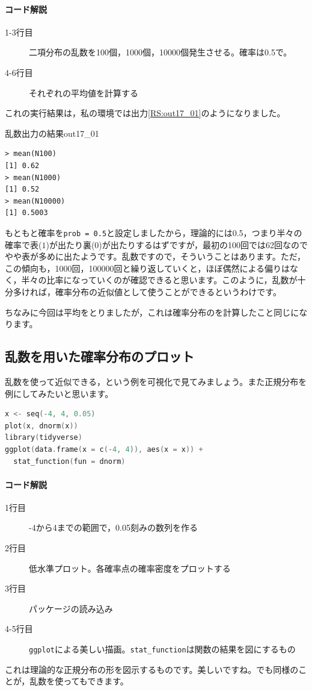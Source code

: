 \documentclass{ltjsbook}
\begin{document}
\paragraph{コード解説}
\begin{description}
	\item[1-3行目] 二項分布の乱数を100個，1000個，10000個発生させる。確率は0.5で。
	\item[4-6行目] それぞれの平均値を計算する
\end{description}
これの実行結果は，私の環境では出力\ref{RS:out17_01}のようになりました。
\begin{Rscreen}{乱数出力の結果}{out17_01}
	\begin{verbatim}
> mean(N100)
[1] 0.62
> mean(N1000)
[1] 0.52
> mean(N10000)
[1] 0.5003\end{verbatim}
\end{Rscreen}

もともと確率を\texttt{prob = 0.5}と設定しましたから，理論的には0.5，つまり半々の確率で表($1$)が出たり裏($0$)が出たりするはずですが，最初の100回では62回なのでやや表が多めに出たようです。乱数ですので，そういうことはあります。ただ，この傾向も，1000回，100000回と繰り返していくと，ほぼ偶然による偏りはなく，半々の比率になっていくのが確認できると思います。このように，乱数が十分多ければ，確率分布の近似値として使うことができるというわけです。

ちなみに今回は平均をとりましたが，これは確率分布のを計算したこと同じになります。
\subsection{乱数を用いた確率分布のプロット}
乱数を使って近似できる，という例を可視化で見てみましょう。また正規分布を例にしてみたいと思います。
\begin{lstlisting}[language=c++,label={code:17_04},caption={確率分布の可視化1}]
x <- seq(-4, 4, 0.05)
plot(x, dnorm(x))
library(tidyverse)
ggplot(data.frame(x = c(-4, 4)), aes(x = x)) +
  stat_function(fun = dnorm)
\end{lstlisting}
\paragraph{コード解説}
\begin{description}
	\item[1行目] -4から4までの範囲で，0.05刻みの数列を作る
	\item[2行目] 低水準プロット。各確率点の確率密度をプロットする
	\item[3行目] パッケージの読み込み
	\item[4-5行目] \texttt{ggplot}による美しい描画。\verb|stat_function|は関数の結果を図にするもの
\end{description}
これは理論的な正規分布の形を図示するものです。美しいですね。でも同様のことが，乱数を使ってもできます。
\end{document}

